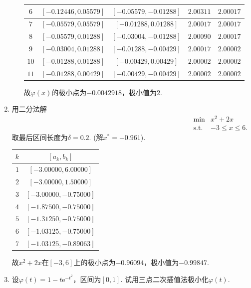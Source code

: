 \begin{enumerate}
\begin{enumerate}[label=(\arabic*)]
\begin{table}[H]
\begin{tabular}{|c|c|c|c|c|}
                $6$ & $[-0.12446,0.05579]$ & $[-0.05579,-0.01288]$ & $2.00311$ & $2.00017$\\ \hline
                $7$ & $[-0.05579,0.05579]$ & $[-0.01288,0.01288]$ & $2.00017$ & $2.00017$\\ \hline
                $8$ & $[-0.05579,0.01288]$ & $[-0.03004,-0.01288]$ & $2.00090$ & $2.00017$\\ \hline
                $9$ & $[-0.03004,0.01288]$ & $[-0.01288,-0.00429]$ & $2.00017$ & $2.00002$\\ \hline
                $10$ & $[-0.01288,0.01288]$ & $[-0.00429,0.00429]$ & $2.00002$ & $2.00002$\\ \hline
                $11$ & $[-0.01288,0.00429]$ & $[-0.00429,-0.00429]$ & $2.00002$ & $2.00002$\\ \hline
            \end{tabular}
        \end{table}
        故$\varphi(x)$的极小点为$-0.0042918$，极小值为2.
    \end{enumerate}
    \item 用二分法解
    \[\begin{array}{lll}
        \min & x^2 + 2x\\
        \mathrm{s.t.} & -3 \leqslant x \leqslant 6.
    \end{array}\]
    取最后区间长度为$\delta=0.2$. (解$x^*=-0.961$).\\
    \sol \begin{table}[H]
        \centering
        \begin{tabular}{|c|c|}
            \hline
            $k$ & $[a_k, b_k]$ \\ \hline
            $1$ & $[-3.00000,6.00000]$ \\ \hline
            $2$ & $[-3.00000,1.50000]$ \\ \hline
            $3$ & $[-3.00000,-0.75000]$ \\ \hline
            $4$ & $[-1.87500,-0.75000]$ \\ \hline
            $5$ & $[-1.31250,-0.75000]$ \\ \hline
            $6$ & $[-1.03125,-0.75000]$ \\ \hline
            $7$ & $[-1.03125,-0.89063]$ \\ \hline
        \end{tabular}
    \end{table}
    故$x^2 + 2x$在$[-3,6]$上的极小点为$-0.96094$，极小值为$-0.99847$.
    \item 设$\varphi(t)=1-t\mathrm{e}^{-t^2}$，区间为$[0,1]$. 试用三点二次插值法极小化$\varphi(t)$.\\

\end{enumerate}
